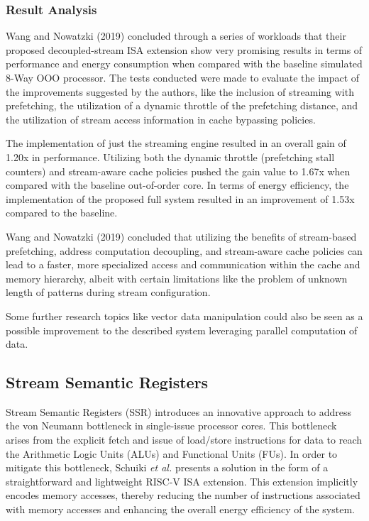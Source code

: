 \subsubsection{Result Analysis}

Wang and Nowatzki (2019) \cite{8980305} concluded through a series of workloads that their proposed decoupled-stream ISA extension show very promising results in terms of performance and energy consumption when compared with the baseline simulated 8-Way OOO processor. The tests conducted were made to evaluate the impact of the improvements suggested by the authors, like the inclusion of streaming with prefetching, the utilization of a dynamic throttle of the prefetching distance, and the utilization of stream access information in cache bypassing policies.

The implementation of just the streaming engine resulted in an overall gain of 1.20x in performance. Utilizing both the dynamic throttle (prefetching stall counters) and stream-aware cache policies pushed the gain value to 1.67x when compared with the baseline out-of-order core. In terms of energy efficiency, the implementation of the proposed full system resulted in an improvement of 1.53x compared to the baseline.

Wang and Nowatzki (2019) \cite{8980305} concluded that utilizing the benefits of stream-based prefetching, address computation decoupling, and stream-aware cache policies can lead to a faster, more specialized access and communication within the cache and memory hierarchy, albeit with certain limitations like the problem of unknown length of patterns during stream configuration.

Some further research topics like vector data manipulation could also be seen as a possible improvement to the described system leveraging parallel computation of data.

\subsection{Stream Semantic Registers}
\label{label:ssr}

Stream Semantic Registers (SSR) \cite{9068465} introduces an innovative approach to address the von Neumann bottleneck in single-issue processor cores. This bottleneck arises from the explicit fetch and issue of load/store instructions for data to reach the Arithmetic Logic Units (ALUs) and Functional Units (FUs). In order to mitigate this bottleneck, Schuiki \textit{et al.} \cite{9068465} presents a solution in the form of a straightforward and lightweight RISC-V ISA extension. This extension implicitly encodes memory accesses, thereby reducing the number of instructions associated with memory accesses and enhancing the overall energy efficiency of the system.

